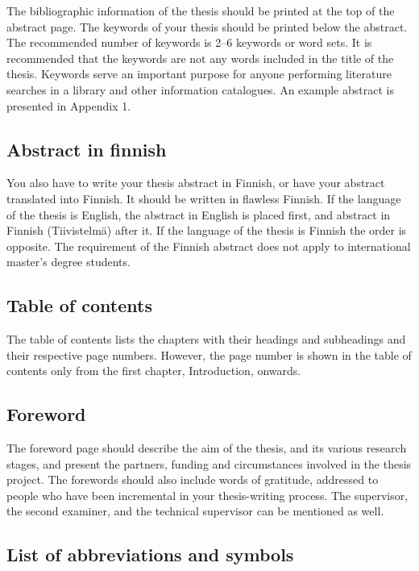 The bibliographic information of the thesis should be printed at the top of the abstract page. The keywords of your thesis should be printed below the abstract. The recommended number of keywords is 2--6 keywords or word sets. It is recommended that the keywords are not any words included in the title of the thesis. Keywords serve an important purpose for anyone performing literature searches in a library and other information catalogues. An example abstract is presented in Appendix 1.

\subsection{Abstract in finnish}

You also have to write your thesis abstract in Finnish, or have your abstract translated into Finnish. It should be written in flawless Finnish. If the language of the thesis is English, the abstract in English is placed first, and abstract in Finnish (Tiivistelmä) after it. If the language of the thesis is Finnish the order is opposite. The requirement of the Finnish abstract does not apply to international master’s degree students.

\subsection{Table of contents}

The table of contents lists the chapters with their headings and subheadings and their respective page numbers. However, the page number is shown in the table of contents only from the first chapter, Introduction, onwards.

\subsection{Foreword}

The foreword page should describe the aim of the thesis, and its various research stages, and present the partners, funding and circumstances involved in the thesis project. The forewords should also include words of gratitude, addressed to people who have been incremental in your thesis-writing process. The supervisor, the second examiner, and the technical supervisor can be mentioned as well.

\subsection{List of abbreviations and symbols}

